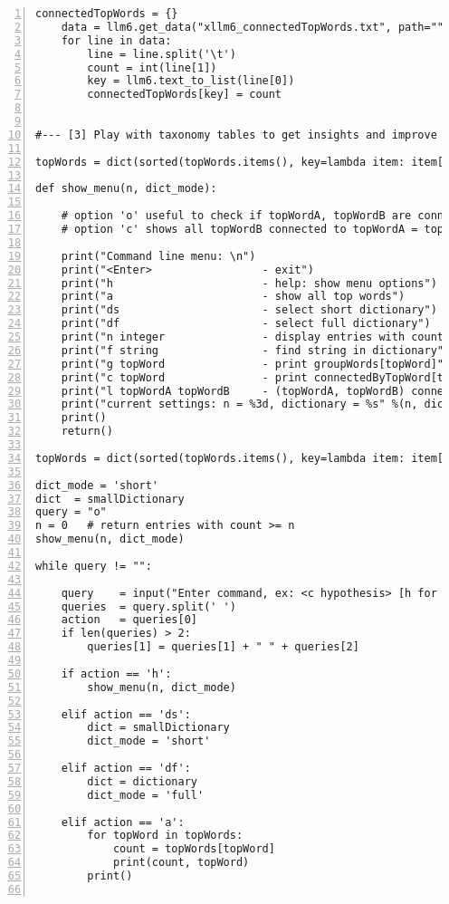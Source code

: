 \documentclass[oneside,10pt]{book}
\begin{document}
\begin{lstlisting}[numbers=left]
    connectedTopWords = {}
    data = llm6.get_data("xllm6_connectedTopWords.txt", path="")
    for line in data:
        line = line.split('\t')
        count = int(line[1])
        key = llm6.text_to_list(line[0])
        connectedTopWords[key] = count


#--- [3] Play with taxonomy tables to get insights and improve them

topWords = dict(sorted(topWords.items(), key=lambda item: item[0]))

def show_menu(n, dict_mode):

    # option 'o' useful to check if topWordA, topWordB are connected or not
    # option 'c' shows all topWordB connected to topWordA = topWord

    print("Command line menu: \n") 
    print("<Enter>                 - exit")
    print("h                       - help: show menu options")
    print("a                       - show all top words")
    print("ds                      - select short dictionary")
    print("df                      - select full dictionary")
    print("n integer               - display entries with count >= integer")
    print("f string                - find string in dictionary")
    print("g topWord               - print groupWords[topWord]")
    print("c topWord               - print connectedByTopWord[topWord]")
    print("l topWordA topWordB     - (topWordA, topWordB) connections count\n")
    print("current settings: n = %3d, dictionary = %s" %(n, dict_mode))
    print()
    return()

topWords = dict(sorted(topWords.items(), key=lambda item: item[0]))

dict_mode = 'short'
dict  = smallDictionary
query = "o"
n = 0   # return entries with count >= n
show_menu(n, dict_mode)

while query != "":  

    query    = input("Enter command, ex: <c hypothesis> [h for help]: ") 
    queries  = query.split(' ')
    action   = queries[0]
    if len(queries) > 2:
        queries[1] = queries[1] + " " + queries[2]

    if action == 'h':
        show_menu(n, dict_mode)

    elif action == 'ds':
        dict = smallDictionary
        dict_mode = 'short'

    elif action == 'df':
        dict = dictionary
        dict_mode = 'full'

    elif action == 'a':
        for topWord in topWords:
            count = topWords[topWord]
            print(count, topWord)
        print()


\end{lstlisting}
\end{document}
